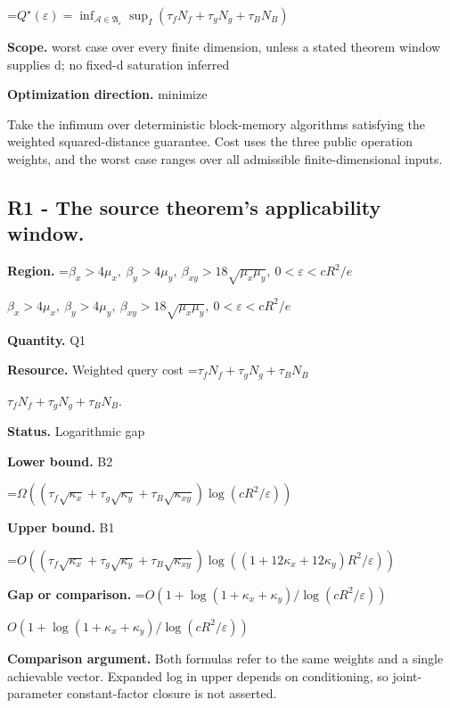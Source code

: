 \documentclass[10pt,a4paper]{article}
\newcommand{\AtlasMath}[1]{\par\begingroup\centering\setbox0=\hbox{$\displaystyle #1$}\ifdim\wd0>1.4\linewidth\typeout{ATLAS WIDE FORMULA: \the\wd0}\fi\ifdim\wd0>\linewidth\resizebox{\linewidth}{!}{\box0}\else\box0\fi\par\endgroup}
\newcommand{\AtlasInlineMath}[1]{\begingroup\setbox0=\hbox{$#1$}\ifdim\wd0>.4\linewidth\endgroup\AtlasMath{#1}\else\endgroup$#1$\fi}
\begin{document}
\AtlasMath{Q^\star(\varepsilon)=\inf_{\mathcal A\in\mathfrak A_\varepsilon}\sup_I(\tau_fN_f+\tau_gN_g+\tau_BN_B)}


\textbf{Scope.} worst case over every finite dimension, unless a stated theorem window supplies d; no fixed-d saturation inferred



\textbf{Optimization direction.} minimize



Take the infimum over deterministic block-memory algorithms satisfying the weighted squared-distance guarantee. Cost uses the three public operation weights, and the worst case ranges over all admissible finite-dimensional inputs.



\subsection{R1 - The source theorem’s applicability window.}


\textbf{Region.} \AtlasInlineMath{\beta_x>4\mu_x,\ \beta_y>4\mu_y,\ \beta_{xy}>18\sqrt{\mu_x\mu_y},\ 0<\varepsilon<cR^2/e}



\textbf{Quantity.} Q1



\textbf{Resource.} Weighted query cost \AtlasInlineMath{\tau_fN_f+\tau_gN_g+\tau_BN_B}.



\textbf{Status.} Logarithmic gap



\textbf{Lower bound.} B2



\AtlasMath{\Omega((\tau_f\sqrt{\kappa_x}+\tau_g\sqrt{\kappa_y}+\tau_B\sqrt{\kappa_{xy}})\log(cR^2/\varepsilon))}


\textbf{Upper bound.} B1



\AtlasMath{O((\tau_f\sqrt{\kappa_x}+\tau_g\sqrt{\kappa_y}+\tau_B\sqrt{\kappa_{xy}})\log((1+12\kappa_x+12\kappa_y)R^2/\varepsilon))}


\textbf{Gap or comparison.} \AtlasInlineMath{O(1+\log(1+\kappa_x+\kappa_y)/\log(cR^2/\varepsilon))}



\textbf{Comparison argument.} Both formulas refer to the same weights and a single achievable vector. Expanded log in upper depends on conditioning, so joint-parameter constant-factor closure is not asserted.
\end{document}
